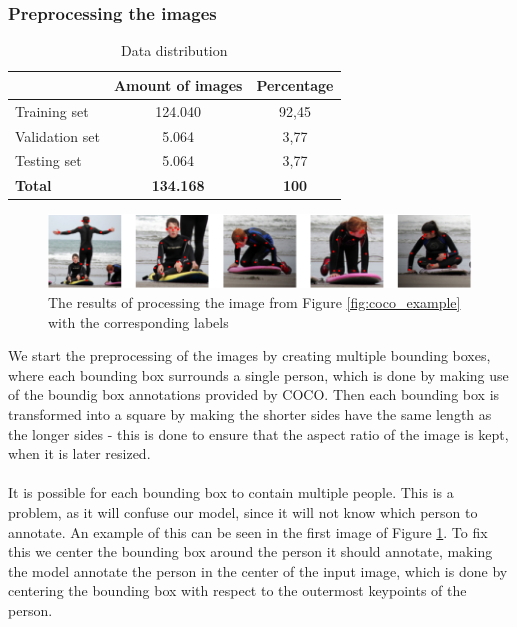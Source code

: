 \documentclass[./main.tex]{subfiles}
\begin{document}
\subsubsection{Preprocessing the images}
\begin{table}[htbp]
    \centering
    \begin{tabular}{l|c|c}
         & Amount of images & Percentage \\
        \hline
        Training set & 124.040 & 92,45 \\
        \hline
        Validation set & 5.064 & 3,77 \\
        \hline
        Testing set & 5.064 & 3,77 \\
        \hline
        \hline
        \textbf{Total} & \textbf{134.168} & \textbf{100} \\
        \hline
    \end{tabular}
    \caption{Data distribution}
    \label{tab:data_distribution}
\end{table}
\begin{figure}[htbp]
    \centering
    \includegraphics[width = \textwidth - 2 cm]{./entities/crop_img.PNG}
    \caption{The results of processing the image from Figure \ref{fig:coco_example} with the corresponding labels \cite{COCO_article}}
    \label{fig:crop_img}
\end{figure}
\noindent We start the preprocessing of the images by creating multiple bounding boxes, where each bounding box surrounds a single person, which is done by making use of the boundig box annotations provided by COCO. Then each bounding box is transformed into a square by making the shorter sides have the same length as the longer sides - this is done to ensure that the aspect ratio of the image is kept, when it is later resized. 
\\
\\
It is possible for each bounding box to contain multiple people. This is a problem, as it will confuse our model, since it will not know which person to annotate. An example of this can be seen in the first image of Figure \ref{fig:crop_img}. To fix this we center the bounding box around the person it should annotate, making the model annotate the person in the center of the input image, which is done by centering the bounding box with respect to the outermost keypoints of the person.
\end{document}
